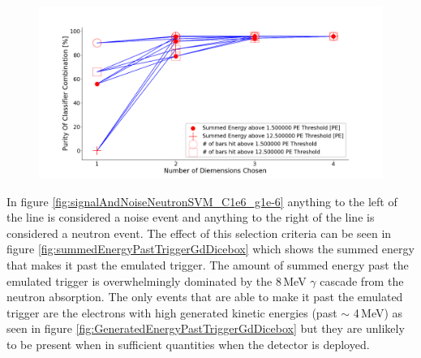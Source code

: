 \begin{figure}[!h]
\centering
\includegraphics[width=\linewidth]{Chapter4/Figs/Raster/purNeutronSVMC1e6_g1e-6.png}
\label{fig:purNeutronSVMC1e6_g1e-6}
\end{figure}

In figure \ref{fig:signalAndNoiseNeutronSVM_C1e6_g1e-6} anything to the left of the line is considered a noise event and anything to the right of the line is considered a neutron event. The effect of this selection criteria can be seen in figure \ref{fig:summedEnergyPastTriggerGdDicebox} which shows the summed energy that makes it past the emulated trigger. The amount of summed energy past the emulated trigger is overwhelmingly dominated by the 8\,MeV $\gamma$ cascade from the neutron absorption. The only events that are able to make it past the emulated trigger are the electrons with high generated kinetic energies (past $\sim$ 4\,MeV) as seen in figure \ref{fig:GeneratedEnergyPastTriggerGdDicebox} but they are unlikely to be present when in sufficient quantities when the detector is deployed. 


